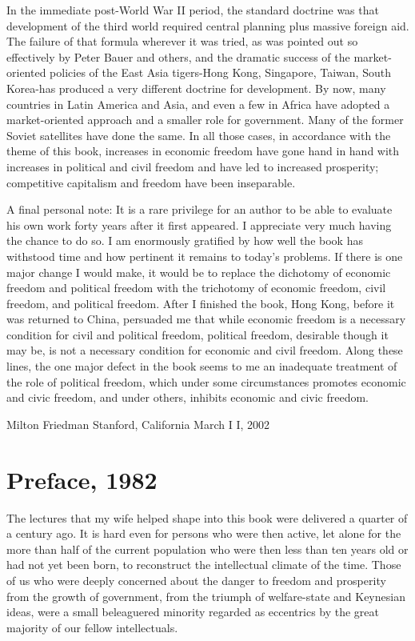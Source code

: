 \documentclass[11pt,openany]{book}
\newcommand{\bookchapterplain}[1]{%
  \clearpage\phantomsection
  \chapter*{#1}%
  \addcontentsline{toc}{chapter}{#1}%
  \markboth{#1}{#1}\thispagestyle{plain}}
\begin{document}
In the immediate post-World War II period, the standard doctrine was that development of the third world required central planning plus massive foreign aid. The failure of that formula wherever it was tried, as was pointed out so effectively by Peter Bauer and others, and the dramatic success of the market-oriented policies of the East Asia tigers-Hong Kong, Singapore, Taiwan, South Korea-has produced a very different doctrine for development. By now, many countries in Latin America and Asia, and even a few in Africa have adopted a market-oriented approach and a smaller role for government. Many of the former Soviet satellites have done the same. In all those cases, in accordance with the theme of this book, increases in economic freedom have gone hand in hand with increases in political and civil freedom and have led to increased prosperity; competitive capitalism and freedom have been inseparable.

A final personal note: It is a rare privilege for an author to be able to evaluate his own work forty years after it first appeared. I appreciate very much having the chance to do so. I am enormously gratified by how well the book has withstood time and how pertinent it remains to today's problems. If there is one major change I would make, it would be to replace the dichotomy of economic freedom and political freedom with the trichotomy of economic freedom, civil freedom, and political freedom. After I finished the book, Hong Kong, before it was returned to China, persuaded me that while economic freedom is a necessary condition for civil and political freedom, political freedom, desirable though it may be, is not a necessary condition for economic and civil freedom. Along these lines, the one major defect in the book seems to me an inadequate treatment of the role of political freedom, which under some circumstances promotes economic and civic freedom, and under others, inhibits economic and civic freedom.

Milton Friedman Stanford, California March I I, 2002

\bookchapterplain{Preface, 1982}

The lectures that my wife helped shape into this book were delivered a quarter of a century ago. It is hard even for persons who were then active, let alone for the more than half of the current population who were then less than ten years old or had not yet been born, to reconstruct the intellectual climate of the time. Those of us who were deeply concerned about the danger to freedom and prosperity from the growth of government, from the triumph of welfare-state and Keynesian ideas, were a small beleaguered minority regarded as eccentrics by the great majority of our fellow intellectuals.
\end{document}
